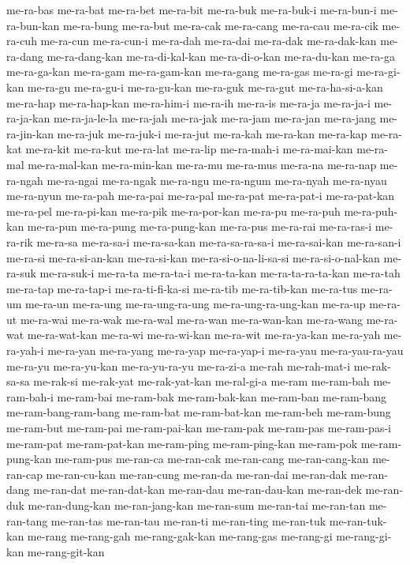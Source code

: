{me-ra-bas me-ra-bat me-ra-bet me-ra-bit me-ra-buk me-ra-buk-i me-ra-bun-i
me-ra-bun-kan me-ra-bung me-ra-but me-ra-cak me-ra-cang me-ra-cau
me-ra-cik me-ra-cuh me-ra-cun me-ra-cun-i me-ra-dah me-ra-dai me-ra-dak
me-ra-dak-kan me-ra-dang me-ra-dang-kan me-ra-di-kal-kan me-ra-di-o-kan
me-ra-du-kan me-ra-ga me-ra-ga-kan me-ra-gam me-ra-gam-kan me-ra-gang
me-ra-gas me-ra-gi me-ra-gi-kan me-ra-gu me-ra-gu-i me-ra-gu-kan me-ra-guk
me-ra-gut me-ra-ha-si-a-kan me-ra-hap me-ra-hap-kan me-ra-him-i me-ra-ih
me-ra-is me-ra-ja me-ra-ja-i me-ra-ja-kan me-ra-ja-le-la me-ra-jah
me-ra-jak me-ra-jam me-ra-jan me-ra-jang me-ra-jin-kan me-ra-juk
me-ra-juk-i me-ra-jut me-ra-kah me-ra-kan me-ra-kap me-ra-kat me-ra-kit
me-ra-kut me-ra-lat me-ra-lip me-ra-mah-i me-ra-mai-kan me-ra-mal
me-ra-mal-kan me-ra-min-kan me-ra-mu me-ra-mus me-ra-na me-ra-nap
me-ra-ngah me-ra-ngai me-ra-ngak me-ra-ngu me-ra-ngum me-ra-nyah
me-ra-nyau me-ra-nyun me-ra-pah me-ra-pai me-ra-pal me-ra-pat me-ra-pat-i
me-ra-pat-kan me-ra-pel me-ra-pi-kan me-ra-pik me-ra-por-kan me-ra-pu
me-ra-puh me-ra-puh-kan me-ra-pun me-ra-pung me-ra-pung-kan me-ra-pus
me-ra-rai me-ra-ras-i me-ra-rik me-ra-sa me-ra-sa-i me-ra-sa-kan
me-ra-sa-ra-sa-i me-ra-sai-kan me-ra-san-i me-ra-si me-ra-si-an-kan
me-ra-si-kan me-ra-si-o-na-li-sa-si me-ra-si-o-nal-kan me-ra-suk
me-ra-suk-i me-ra-ta me-ra-ta-i me-ra-ta-kan me-ra-ta-ra-ta-kan me-ra-tah
me-ra-tap me-ra-tap-i me-ra-ti-fi-ka-si me-ra-tib me-ra-tib-kan me-ra-tus
me-ra-um me-ra-un me-ra-ung me-ra-ung-ra-ung me-ra-ung-ra-ung-kan me-ra-up
me-ra-ut me-ra-wai me-ra-wak me-ra-wal me-ra-wan me-ra-wan-kan me-ra-wang
me-ra-wat me-ra-wat-kan me-ra-wi me-ra-wi-kan me-ra-wit me-ra-ya-kan
me-ra-yah me-ra-yah-i me-ra-yan me-ra-yang me-ra-yap me-ra-yap-i me-ra-yau
me-ra-yau-ra-yau me-ra-yu me-ra-yu-kan me-ra-yu-ra-yu me-ra-zi-a me-rah
me-rah-mat-i me-rak-sa-sa me-rak-si me-rak-yat me-rak-yat-kan me-ral-gi-a
me-ram me-ram-bah me-ram-bah-i me-ram-bai me-ram-bak me-ram-bak-kan
me-ram-ban me-ram-bang me-ram-bang-ram-bang me-ram-bat me-ram-bat-kan
me-ram-beh me-ram-bung me-ram-but me-ram-pai me-ram-pai-kan me-ram-pak
me-ram-pas me-ram-pas-i me-ram-pat me-ram-pat-kan me-ram-ping
me-ram-ping-kan me-ram-pok me-ram-pung-kan me-ram-pus me-ran-ca me-ran-cak
me-ran-cang me-ran-cang-kan me-ran-cap me-ran-cu-kan me-ran-cung me-ran-da
me-ran-dai me-ran-dak me-ran-dang me-ran-dat me-ran-dat-kan me-ran-dau
me-ran-dau-kan me-ran-dek me-ran-duk me-ran-dung-kan me-ran-jang-kan
me-ran-sum me-ran-tai me-ran-tan me-ran-tang me-ran-tas me-ran-tau
me-ran-ti me-ran-ting me-ran-tuk me-ran-tuk-kan me-rang me-rang-gah
me-rang-gak-kan me-rang-gas me-rang-gi me-rang-gi-kan me-rang-git-kan
}

